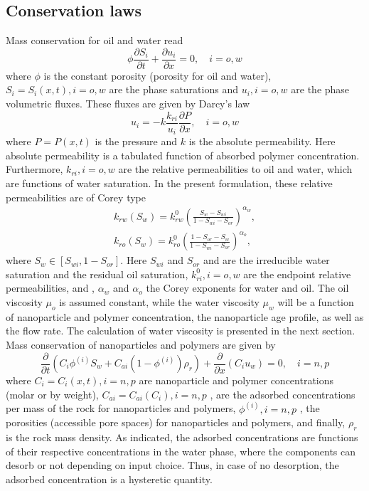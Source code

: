 \documentclass[journal = enfuem, manuscript =  article]{achemso}
\begin{document}
\subsection{Conservation laws}
Mass conservation for oil and water read
\begin{equation} \label{eq:massConservation} %
    \phi\frac{\partial S_i}{\partial t}+\frac{\partial u_i}{\partial x} = 0,\quad i = o, w
\end{equation}
where $\phi$ is the constant porosity (porosity for oil and water), $S_i=S_i(x,t), i = o,w$ are the phase saturations and $u_i, i=o,w$ are the phase volumetric fluxes. These fluxes are given by Darcy’s law
\begin{equation} \label{eq:fluxes} %
    u_i= -k\frac{k_{ri}}{u_i}\frac{\partial P}{\partial x},\quad i = o, w
\end{equation}
where $P=P(x,t)$  is the pressure and $k$ is the absolute permeability. Here absolute permeability is a tabulated function of absorbed polymer concentration. Furthermore, $k_{ri}, i = o, w$ are the relative permeabilities to oil and water, which are functions of water saturation. In the present formulation, these relative permeabilities are of Corey type
\begin{subequations}
\begin{eqnarray}
 k_{rw}(S_w)=k^0_{rw}(\frac{S_w-S_{wi}}{1-S_{wi}-S_{or}})^{\alpha_w} ,\\
    k_{ro}(S_w)=k^0_{ro}(\frac{1-S_{or}-S_{w}}{1-S_{wi}-S_{or}})^{\alpha_o} ,
\end{eqnarray}
\end{subequations}
where $S_w\in [S_{wi}, 1-S_{or}]$. Here $S_{wi}$ and $S_{or}$ and are the irreducible water saturation and the residual oil saturation, $k^0_{ri}, i=o,w$  are the endpoint relative permeabilities, and , $\alpha_w$ and $\alpha_o$  the Corey exponents for water and oil. The oil viscosity $\mu_o$ is assumed constant, while the water viscosity $\mu_w$ will be a function of nanoparticle and polymer concentration, the nanoparticle age profile, as well as the flow rate. The calculation of water viscosity is presented in the next section.
Mass conservation of nanoparticles and polymers are given by 
\begin{equation} \label{eq:massConsNPpol} %
    \frac{\partial}{\partial t}(C_i\phi^{(i)}S_w + C_{ai}(1-\phi^{(i)})\rho_r)+ \frac{\partial}{\partial x}(C_i u_w) = 0, \quad i = n, p
\end{equation}
where $C_i=C_i(x,t), i=n,p$ are nanoparticle and polymer concentrations (molar or by weight), $C_{ai}=C_{ai}(C_i), i=n,p$ , are the adsorbed concentrations per mass of the rock for nanoparticles and polymers, $\phi^{(i)}, i=n,p$ , the porosities (accessible pore spaces) for nanoparticles and polymers, and finally, $\rho_r$ is the rock mass density. As indicated, the adsorbed concentrations are functions of their respective concentrations in the water phase, where the components can desorb or not depending on input choice. Thus, in case of no desorption, the adsorbed concentration is a hysteretic quantity.   
\end{document}
